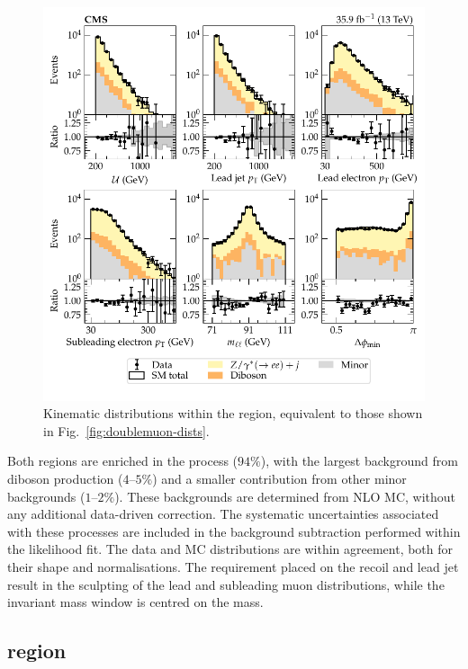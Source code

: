 \begin{figure}[htb]
    \centering
    \includegraphics{chapters/043_results/images/doubleelectron_dists.pdf}
    \caption[Dielectron kinematics.]{
        Kinematic distributions within the \dieleplusjets region, equivalent to those shown in Fig.~\ref{fig:doublemuon-dists}.
    }
    \label{fig:doubleelectron-dists}
\end{figure}
%
Both regions are enriched in the \IDYllj process ($94\%$), with the largest background from diboson production ($4$--$5\%$) and a smaller contribution from other minor backgrounds ($1$--$2\%$). These backgrounds are determined from NLO MC, without any additional data-driven correction. The systematic uncertainties associated with these processes are included in the background subtraction performed within the likelihood fit. The data and MC distributions are within agreement, both for their shape and normalisations. The requirement placed on the recoil and lead jet \pt result in the sculpting of the lead and subleading muon distributions, while the invariant mass window is centred on the \PZ mass.


\subsection{\metplusjets region}

